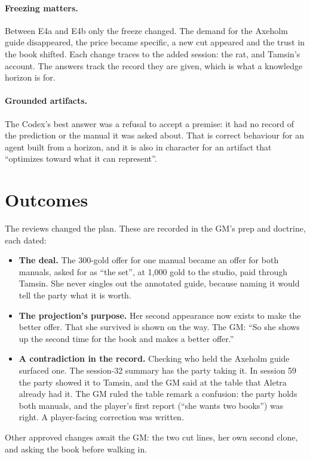 \documentclass[11pt]{article}
\begin{document}
\paragraph{Freezing matters.} Between E4a and E4b only the freeze changed. The demand for
the Axeholm guide disappeared, the price became specific, a new cut appeared and the trust
in the book shifted. Each change traces to the added session: the rat, and Tamsin's
account. The answers track the record they are given, which is what a knowledge horizon is
for.

\paragraph{Grounded artifacts.} The Codex's best answer was a refusal to accept a premise:
it had no record of the prediction or the manual it was asked about. That is
correct behaviour for an agent built from a horizon, and it is also in character for an
artifact that ``optimizes toward what it can represent''.

\section{Outcomes}
\label{sec:outcomes}

The reviews changed the plan. These are recorded in the GM's prep and doctrine, each dated:
\begin{itemize}[nosep]
\item \textbf{The deal.} The 300-gold offer for one manual became an offer for both manuals,
asked for as ``the set'', at 1{,}000 gold to the studio, paid through Tamsin. She never
singles out the annotated guide, because naming it would tell the party what it is worth.
\item \textbf{The projection's purpose.} Her second appearance now exists to make the better
offer. That she survived is shown on the way. The GM: ``So she shows up the second time for
the book and makes a better offer.''
\item \textbf{A contradiction in the record.} Checking who held the Axeholm guide surfaced
one. The session-32 summary has the party taking it. In session 59 the party showed it to
Tamsin, and the GM said at the table that Aletra already had it. The GM ruled the table
remark a confusion: the party holds both manuals, and the player's first report (``she wants
two books'') was right. A player-facing correction was written.
\end{itemize}
Other approved changes await the GM: the two cut lines, her own second clone, and asking the
book before walking in.
\end{document}
